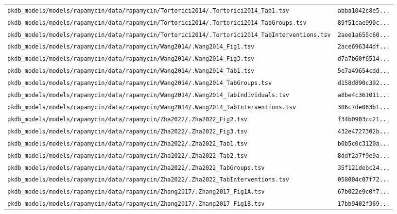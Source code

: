 \begin{longtable}{ll}
\texttt{pkdb\_models/models/rapamycin/data/rapamycin/Tortorici2014/.Tortorici2014\_Tab1.tsv} & \texttt{abba1042c8e5...} \\
\texttt{pkdb\_models/models/rapamycin/data/rapamycin/Tortorici2014/.Tortorici2014\_TabGroups.tsv} & \texttt{89f51cae990c...} \\
\texttt{pkdb\_models/models/rapamycin/data/rapamycin/Tortorici2014/.Tortorici2014\_TabInterventions.tsv} & \texttt{2aee1a655c60...} \\
\texttt{pkdb\_models/models/rapamycin/data/rapamycin/Wang2014/.Wang2014\_Fig1.tsv} & \texttt{2ace696344df...} \\
\texttt{pkdb\_models/models/rapamycin/data/rapamycin/Wang2014/.Wang2014\_Fig3.tsv} & \texttt{d7a7b60f6514...} \\
\texttt{pkdb\_models/models/rapamycin/data/rapamycin/Wang2014/.Wang2014\_Tab1.tsv} & \texttt{5e7a49654cdd...} \\
\texttt{pkdb\_models/models/rapamycin/data/rapamycin/Wang2014/.Wang2014\_TabGroups.tsv} & \texttt{d158d890c392...} \\
\texttt{pkdb\_models/models/rapamycin/data/rapamycin/Wang2014/.Wang2014\_TabIndividuals.tsv} & \texttt{a8be4c361011...} \\
\texttt{pkdb\_models/models/rapamycin/data/rapamycin/Wang2014/.Wang2014\_TabInterventions.tsv} & \texttt{386c7de063b1...} \\
\texttt{pkdb\_models/models/rapamycin/data/rapamycin/Zha2022/.Zha2022\_Fig2.tsv} & \texttt{f34b0903cc21...} \\
\texttt{pkdb\_models/models/rapamycin/data/rapamycin/Zha2022/.Zha2022\_Fig3.tsv} & \texttt{432e4727302b...} \\
\texttt{pkdb\_models/models/rapamycin/data/rapamycin/Zha2022/.Zha2022\_Tab1.tsv} & \texttt{b0b5c0c3120a...} \\
\texttt{pkdb\_models/models/rapamycin/data/rapamycin/Zha2022/.Zha2022\_Tab2.tsv} & \texttt{8ddf2a7f9e9a...} \\
\texttt{pkdb\_models/models/rapamycin/data/rapamycin/Zha2022/.Zha2022\_TabGroups.tsv} & \texttt{35f121debc24...} \\
\texttt{pkdb\_models/models/rapamycin/data/rapamycin/Zha2022/.Zha2022\_TabInterventions.tsv} & \texttt{058004c07f72...} \\
\texttt{pkdb\_models/models/rapamycin/data/rapamycin/Zhang2017/.Zhang2017\_Fig1A.tsv} & \texttt{67b022e9c0f7...} \\
\texttt{pkdb\_models/models/rapamycin/data/rapamycin/Zhang2017/.Zhang2017\_Fig1B.tsv} & \texttt{17bb9402f369...} \\

\end{longtable}

